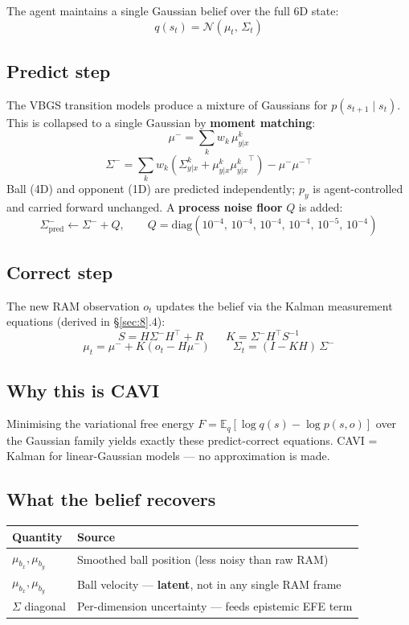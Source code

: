 \documentclass[12pt, a4paper]{article}
\newcommand{\E}{\mathbb{E}}
\newcommand{\1}{\mathbf{1}}
\newcommand{\cN}{\mathcal{N}}
\begin{document}
The agent maintains a single Gaussian belief over the full 6D state:
\[
q(s_t) = \cN(\mu_t,\, \Sigma_t)
\]

\subsection{Predict step}

The VBGS transition models produce a mixture of Gaussians for
$p(s_{t+1} \mid s_t)$.  This is collapsed to a single Gaussian by
\textbf{moment matching}:
\[
\mu^- = \sum_k w_k\, \mu^k_{y|x}
\]
\[
\Sigma^- = \sum_k w_k\!\left(\Sigma^k_{y|x}
  + \mu^k_{y|x}{\mu^k_{y|x}}^\top\right) - \mu^-{\mu^-}^\top
\]
Ball (4D) and opponent (1D) are predicted independently; $p_y$ is
agent-controlled and carried forward unchanged.
A \textbf{process noise floor} $Q$ is added:
\[
\Sigma^-_{\text{pred}} \leftarrow \Sigma^- + Q,
\qquad
Q = \mathrm{diag}(10^{-4},\, 10^{-4},\, 10^{-4},\, 10^{-4},\, 10^{-5},\, 10^{-4})
\]

\subsection{Correct step}

The new RAM observation $o_t$ updates the belief via the Kalman measurement
equations (derived in \S\ref{sec:8}.4):
\[
S = H\Sigma^- H^\top + R
\qquad
K = \Sigma^- H^\top S^{-1}
\]
\[
\mu_t = \mu^- + K(o_t - H\mu^-)
\qquad
\Sigma_t = (I - KH)\,\Sigma^-
\]

\subsection{Why this is CAVI}

Minimising the variational free energy
$F = \E_q[\log q(s) - \log p(s,o)]$ over the Gaussian family yields exactly
these predict-correct equations.  CAVI = Kalman for linear-Gaussian models ---
no approximation is made.

\subsection{What the belief recovers}

\begin{table}[ht]
\centering
\begin{tabular}{ll}
\toprule
Quantity & Source \\
\midrule
$\mu_{b_x}, \mu_{b_y}$ &
  Smoothed ball position (less noisy than raw RAM) \\
$\mu_{\dot b_x}, \mu_{\dot b_y}$ &
  Ball velocity --- \textbf{latent}, not in any single RAM frame \\
$\Sigma$ diagonal &
  Per-dimension uncertainty --- feeds epistemic EFE term \\
\bottomrule
\end{tabular}
\end{table}
\end{document}
